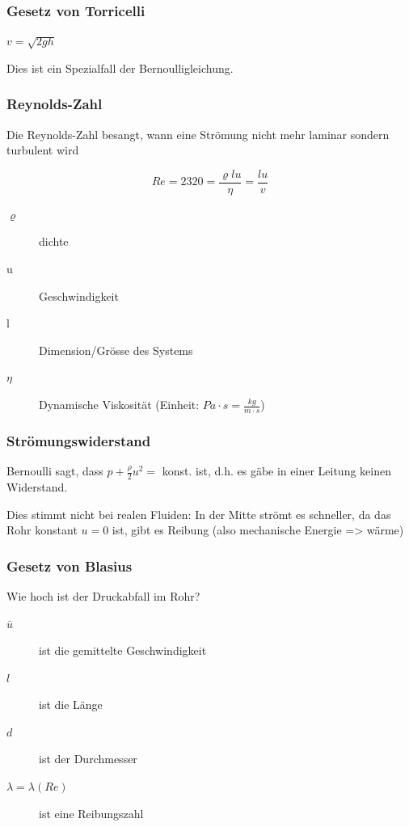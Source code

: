 \documentclass[a4paper]{scrartcl}
\begin{document}
\subsubsection{Gesetz von Torricelli}

$v = \sqrt{2gh}$

Dies ist ein Spezialfall der Bernoulligleichung.

\subsubsection{Reynolds-Zahl}

Die Reynolds-Zahl besangt, wann eine Strömung nicht mehr laminar sondern turbulent wird

\[
	Re = 2320 = \frac{\varrho lu}{\eta} = \frac{lu}{v}
\]

\begin{description}
\item[$\varrho$] dichte
\item[u] Geschwindigkeit
\item[l] Dimension/Grösse des Systems
\item[$\eta$] Dynamische Viskosität (Einheit: $Pa \cdot s = \frac{kg}{m \cdot s}$)
\end{description}


\subsubsection{Strömungswiderstand}

Bernoulli sagt, dass $p + \frac{\rho}{2} u^2 =$ konst. ist, d.h. es gäbe in einer Leitung keinen Widerstand.

Dies stimmt nicht bei realen Fluiden: In der Mitte strömt es schneller, da das Rohr konstant $u=0$ ist, gibt es Reibung (also mechanische Energie => wärme)


\subsubsection{Gesetz von Blasius}

Wie hoch ist der Druckabfall im Rohr?

\begin{description}
	\item[$\bar{u}$] ist die gemittelte Geschwindigkeit
	\item[$l$] ist die Länge
	\item[$d$] ist der Durchmesser
	\item[$\lambda = \lambda(Re)$] ist eine Reibungszahl %
\end{description}
\end{document}
